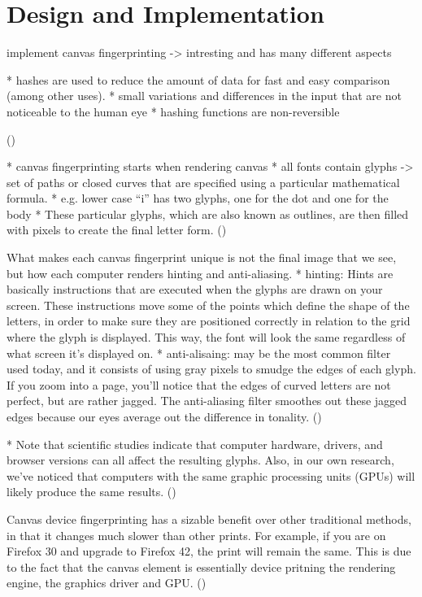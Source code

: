 \chapter{Design and Implementation}
\label{cha:implementation}
implement canvas fingerprinting -> intresting and has many different aspects


* hashes are used to reduce the amount of data for fast and easy comparison (among other uses).
* small variations and differences in the input that are not noticeable to the human eye
* hashing functions are non-reversible

(\textcite{multilogin17})

* canvas fingerprinting starts when rendering canvas
* all fonts contain glyphs ->  set of paths or closed curves that are specified using a particular mathematical formula. 
* e.g. lower case “i” has two glyphs, one for the dot and one for the body
* These particular glyphs, which are also known as outlines, are then filled with pixels to create the final letter form.
(\textcite{multilogin17})

What makes each canvas fingerprint unique is not the final image that we see, but how each computer renders hinting and anti-aliasing.
* hinting: Hints are basically instructions that are executed when the glyphs are drawn on your screen. These instructions move some of the points which define the shape of the letters, in order to make sure they are positioned correctly in relation to the grid where the glyph is displayed. This way, the font will look the same regardless of what screen it’s displayed on.
* anti-alisaing: may be the most common filter used today, and it consists of using gray pixels to smudge the edges of each glyph. If you zoom into a page, you’ll notice that the edges of curved letters are not perfect, but are rather jagged. The anti-aliasing filter smoothes out these jagged edges because our eyes average out the difference in tonality.
(\textcite{multilogin17})

* Note that scientific studies indicate that computer hardware, drivers, and browser versions can all affect the resulting glyphs. Also, in our own research, we’ve noticed that computers with the same graphic processing units (GPUs) will likely produce the same results.
(\textcite{multilogin17})

Canvas device fingerprinting has a sizable benefit over other traditional methods, in that it changes much slower than other prints. For example, if you are on Firefox 30 and upgrade to Firefox 42, the print will remain the same. This is due to the fact that the canvas element is essentially device pritning the rendering engine, the graphics driver and GPU. 
(\textcite{jkula17})

